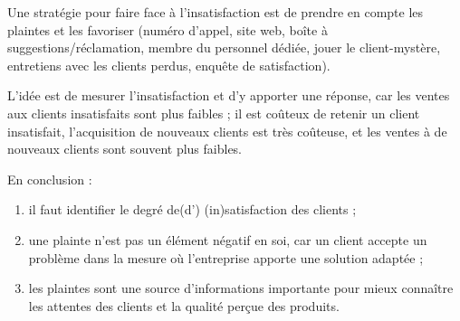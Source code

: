 		Une stratégie pour faire face à l'insatisfaction est de prendre en compte les plaintes et les favoriser (numéro d'appel, site web, boîte à suggestions/réclamation, membre du personnel dédiée, jouer le client-mystère, entretiens avec les clients perdus, enquête de satisfaction).
		
		L'idée est de mesurer l'insatisfaction et d'y apporter une réponse, car les ventes aux clients insatisfaits sont plus faibles ; il est coûteux de retenir un client insatisfait, l'acquisition de nouveaux clients est très coûteuse, et les ventes à de nouveaux clients sont souvent plus faibles.
		
		En conclusion :
		
		\begin{enumerate}
			\item il faut identifier le degré de(d') (in)satisfaction des clients ;
			\item une plainte n'est pas un élément négatif en soi, car un client accepte un problème dans la mesure où l'entreprise apporte une solution adaptée ; 
			\item les plaintes sont une source d'informations importante pour mieux connaître les attentes des clients et la qualité perçue des produits.
		\end{enumerate}
	